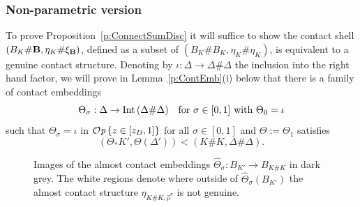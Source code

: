 \documentclass[12pt]{paper}
\theoremstyle{plain}
\theoremstyle{definition}
\newcommand{\wh}{\widehat}
\newcommand{\B}{{\bf B}}
\newcommand{\Int}{{\rm Int\,}} %
\def\Op{{\mathcal O}{\it p}\,}
\numberwithin{figure}{section}
\begin{document}
\subsubsection{Non-parametric version}\label{sec:filling}

To prove Proposition~\ref{p:ConnectSumDisc} it 
will suffice to show the contact shell $(B_K \# \B, \eta_K \# \xi_\B)$, defined as a subset of
$(B_K \# B_K, \eta_K \# \eta_K)$, is equivalent to a genuine contact structure.
Denoting by $\iota\colon \Delta \to \Delta \# \Delta$ the inclusion into the right hand factor,
we will prove in Lemma~\ref{p:ContEmb}(i) below that
there is a family of contact embeddings 
\begin{equation}\label{e:Theta}
	\Theta_\sigma: \Delta \to \Int(\Delta \# \Delta) \quad\mbox{for $\sigma \in [0,1]$ with $\Theta_0 = \iota$}
\end{equation}
such that $\Theta_\sigma = \iota$ in $\Op \{z \in [z_D, 1]\}$ for all $\sigma \in [0,1]$
and $\Theta := \Theta_1$ satisfies 
$$(\Theta_*K' , \Theta(\Delta')) < (K \# K, \Delta \# \Delta).$$



\begin{figure}[h]
   \centering
   \def\svgwidth{300pt}
   
   \caption{Images of the almost contact embeddings $\wh{\Theta}_\sigma : B_{K'} \to B_{K\#K}$ in dark grey.
   The white regions denote where outside of $\wh{\Theta}_\sigma(B_{K'})$ the almost contact structure
   $\eta_{K\#K,\hat{\rho}^\sigma}$ is not genuine.}
  \label{f:embedHamiltonian3}
\end{figure} 
\end{document}
